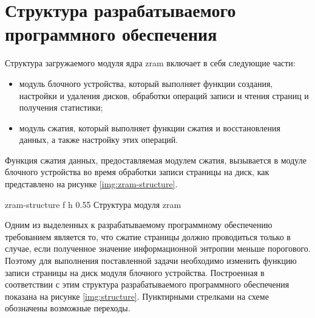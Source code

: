 \section{Структура разрабатываемого программного обеспечения}

Структура загружаемого модуля ядра zram включает в себя следующие части:
\begin{itemize}
	\item модуль блочного устройства, который выполняет функции создания, настройки и удаления дисков, обработки операций записи и чтения страниц и получения статистики;
	\item модуль сжатия, который выполняет функции сжатия и восстановления данных, а также настройку этих операций.
\end{itemize}

Функция сжатия данных, предоставляемая модулем сжатия, вызывается в модуле блочного устройства во время обработки записи страницы на диск, как представлено на рисунке \ref{img:zram-structure}.

    {zram-structure}
    {f}
    {h}
    {0.55\textwidth}
    {Структура модуля zram}

Одним из выделенных к разрабатываемому программному обеспечению требованием является то, что сжатие страницы должно проводиться только в случае, если полученное значение информационной энтропии меньше порогового. Поэтому для выполнения поставленной задачи необходимо изменить функцию записи страницы на диск модуля блочного устройства. Построенная в соответствии с этим структура разрабатываемого программного обеспечения показана на рисунке \ref{img:structure}. Пунктирными стрелками на схеме обозначены возможные переходы.

